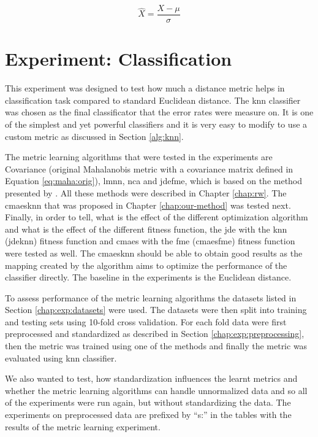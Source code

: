 \documentclass[12pt,a4paper]{report}
\begin{document}
\begin{equation} \label{eq:stand}
\hat{X} = \frac{X-\mu}{\sigma}
\end{equation}

\section{Experiment: Classification} \label{chap:exp:classification}

This experiment was designed to test how much a distance metric helps in classification task compared to standard Euclidean distance. The \ac{knn} classifier was chosen as the final classificator that the error rates were measure on. It is one of the simplest and yet powerful classifiers and it is very easy to modify to use a custom metric as discussed in Section \ref{alg:knn}.

The metric learning algorithms that were tested in the experiments are Covariance (original Mahalanobis metric with a covariance matrix defined in Equation \ref{eq:maha:orig}), \ac{lmnn}, \ac{nca} and \ac{jdefme}, which is based on the method presented by \citep{fukui2013evolutionary}. All these methods were described in Chapter \ref{chap:rw}. The \ac{cmaesknn} that was proposed in Chapter \ref{chap:our-method} was tested next. Finally, in order to tell, what is the effect of the different optimization algorithm and what is the effect of the different fitness function, the \ac{jde} with the \ac{knn} (\ac{jdeknn}) fitness function and \ac{cmaes} with the \acl{fme} (\ac{cmaesfme}) fitness function were tested as well. The \ac{cmaesknn} should be able to obtain good results as the mapping created by the algorithm aims to optimize the performance of the classifier directly. The baseline in the experiments is the Euclidean distance.

To assess performance of the metric learning algorithms the datasets listed in Section \ref{chap:exp:datasets} were used. The datasets were then split into training and testing sets using 10-fold cross validation. For each fold data were first preprocessed and standardized as described in Section \ref{chap:exp:preprocessing}, then the metric was trained using one of the methods and finally the metric was evaluated using \ac{knn} classifier.

We also wanted to test, how standardization influences the learnt metrics and whether the metric learning algorithms can handle unnormalized data and so all of the experiments were run again, but without standardizing the data. The experiments on preprocessed data are prefixed by ``s:'' in the tables with the results of the metric learning experiment.
\end{document}
